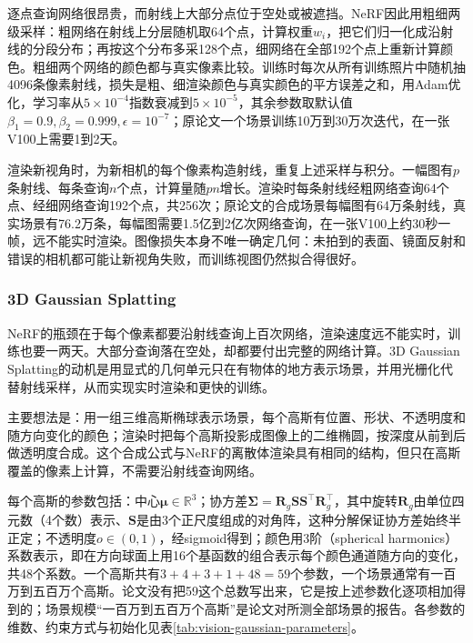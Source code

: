 逐点查询网络很昂贵，而射线上大部分点位于空处或被遮挡。NeRF因此用粗细两级采样：粗网络在射线上分层随机取64个点，计算权重$w_i$，把它们归一化成沿射线的分段分布；再按这个分布多采128个点，细网络在全部192个点上重新计算颜色。粗细两个网络的颜色都与真实像素比较。训练时每次从所有训练照片中随机抽4096条像素射线，损失是粗、细渲染颜色与真实颜色的平方误差之和，用Adam优化，学习率从$5\times10^{-4}$指数衰减到$5\times10^{-5}$，其余参数取默认值$\beta_1=0.9,\beta_2=0.999,\epsilon=10^{-7}$；原论文一个场景训练10万到30万次迭代，在一张V100上需要1到2天。

渲染新视角时，为新相机的每个像素构造射线，重复上述采样与积分。一幅图有$p$条射线、每条查询$n$个点，计算量随$pn$增长。渲染时每条射线经粗网络查询64个点、经细网络查询192个点，共256次；原论文的合成场景每幅图有64万条射线，真实场景有76.2万条，每幅图需要1.5亿到2亿次网络查询，在一张V100上约30秒一帧，远不能实时渲染。图像损失本身不唯一确定几何：未拍到的表面、镜面反射和错误的相机都可能让新视角失败，而训练视图仍然拟合得很好。

\subsubsection{3D Gaussian Splatting}
\label{sec:vision-generation-gaussians}

NeRF的瓶颈在于每个像素都要沿射线查询上百次网络，渲染速度远不能实时，训练也要一两天。大部分查询落在空处，却都要付出完整的网络计算。3D Gaussian Splatting的动机是用显式的几何单元只在有物体的地方表示场景，并用光栅化代替射线采样，从而实现实时渲染和更快的训练。

主要想法是：用一组三维高斯椭球表示场景，每个高斯有位置、形状、不透明度和随方向变化的颜色；渲染时把每个高斯投影成图像上的二维椭圆，按深度从前到后做透明度合成。这个合成公式与NeRF的离散体渲染具有相同的结构，但只在高斯覆盖的像素上计算，不需要沿射线查询网络。

每个高斯的参数包括：中心$\bm{\mu}\in\mathbb{R}^3$；协方差$\bm{\Sigma}=\bm{R}_{g}\bm{S}\bm{S}^{\top}\bm{R}_{g}^{\top}$，其中旋转$\bm{R}_{g}$由单位四元数（4个数）表示、$\bm{S}$是由3个正尺度组成的对角阵，这种分解保证协方差始终半正定；不透明度$o\in(0,1)$，经sigmoid得到；颜色用3阶（spherical harmonics）系数表示，即在方向球面上用16个基函数的组合表示每个颜色通道随方向的变化，共48个系数。一个高斯共有$3+4+3+1+48=59$个参数，一个场景通常有一百万到五百万个高斯。论文没有把59这个总数写出来，它是按上述参数化逐项相加得到的；场景规模“一百万到五百万个高斯”是论文对所测全部场景的报告。各参数的维数、约束方式与初始化见表\ref{tab:vision-gaussian-parameters}。

